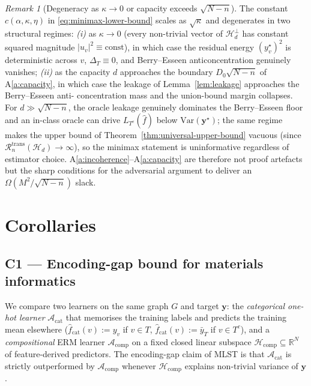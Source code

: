 \documentclass[11pt,a4paper]{article}
\theoremstyle{plain}
\theoremstyle{definition}
\theoremstyle{remark}
\newtheorem{remark}[theorem]{Remark}
\newcommand{\by}{\mathbf{y}}
\newcommand{\R}{\mathbb{R}}
\newcommand{\Var}{\mathrm{Var}}
\newcommand{\Acal}{\mathcal{A}}
\newcommand{\Hcal}{\mathcal{H}}
\begin{document}
\begin{remark}[Degeneracy as $\kappa \to 0$ or capacity exceeds $\sqrt{N-n}$]
\label{rem:gamma-degeneracy}
The constant $c(\alpha,\kappa,\eta)$ in
\eqref{eq:minimax-lower-bound} scales as $\sqrt{\kappa}$ and
degenerates in two structural regimes:
\emph{(i)} as $\kappa \to 0$ (every non-trivial vector of
$\Hcal_d^\perp$ has constant squared magnitude $|u_v|^2 \equiv
\mathrm{const}$), in which case the residual energy
$(y^\star_v)^2$ is deterministic across $v$, $\Delta_T \equiv 0$,
and Berry--Esseen anticoncentration genuinely vanishes;
\emph{(ii)} as the capacity $d$ approaches the boundary
$D_0\sqrt{N-n}$ of A\ref{a:capacity}, in which case the leakage
of Lemma~\ref{lem:leakage} approaches the Berry--Esseen anti-%
concentration mass and the union-bound margin collapses. For
$d \gg \sqrt{N-n}$, the oracle leakage genuinely dominates the
Berry--Esseen floor and an in-class oracle can drive $L_{T^c}(\hat
f)$ below $\Var(\by^\star)$; the same regime makes the upper bound
of Theorem~\ref{thm:universal-upper-bound} vacuous (since
$\mathcal{R}^{\mathrm{trans}}_n(\Hcal_d) \to \infty$), so the
minimax statement is uninformative regardless of estimator choice.
A\ref{a:incoherence}--A\ref{a:capacity} are therefore not proof
artefacts but the sharp conditions for the adversarial argument
to deliver an $\Omega(M^2/\sqrt{N-n})$ slack.
\end{remark}

\section{Corollaries}
\label{sec:corollaries}

\subsection{C1 --- Encoding-gap bound for materials informatics}
\label{subsec:c1}

We compare two learners on the same graph $G$ and target $\by$:
the \emph{categorical one-hot learner} $\Acal_{\mathrm{cat}}$ that
memorises the training labels and predicts the training mean
elsewhere ($\hat f_{\mathrm{cat}}(v) := y_v$ if $v \in T$,
$\hat f_{\mathrm{cat}}(v) := \bar y_T$ if $v \in T^c$), and a
\emph{compositional} ERM learner $\Acal_{\mathrm{comp}}$ on a
fixed closed linear subspace $\Hcal_{\mathrm{comp}} \subseteq \R^N$
of feature-derived predictors.  The encoding-gap claim of MLST
\citep{FossePallares2026applicabilityBound} is that
$\Acal_{\mathrm{cat}}$ is strictly outperformed by
$\Acal_{\mathrm{comp}}$ whenever $\Hcal_{\mathrm{comp}}$ explains
non-trivial variance of $\by$.
\end{document}
